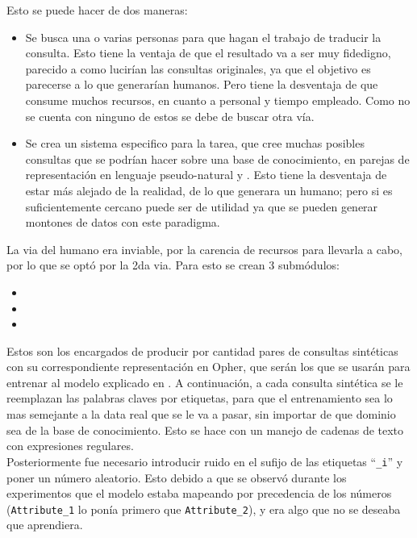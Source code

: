 Esto se puede hacer de dos maneras:
\begin{itemize}
    \item Se busca una o varias personas para que hagan el trabajo de traducir la consulta. Esto tiene la ventaja de que el resultado va a ser muy fidedigno, parecido a como lucir\'ian las consultas originales, ya que el objetivo es parecerse a lo que generar\'ian humanos. Pero tiene la desventaja de que consume muchos recursos, en cuanto a personal y tiempo empleado. Como no se cuenta con ninguno de estos se debe de buscar otra v\'ia.
    
    \item Se crea un sistema especifico para la tarea, que cree muchas posibles consultas que se podr\'ian hacer sobre una base de conocimiento, en parejas de representaci\'on en lenguaje pseudo-natural y . Esto tiene la desventaja de estar m\'as alejado de la realidad, de lo que generara un humano; pero si es suficientemente cercano puede ser de utilidad ya que se pueden generar montones de datos con este paradigma.
\end{itemize}

La via del humano era inviable, por la carencia de recursos para llevarla a cabo, por lo que se opt\'o por la 2da via. Para esto se crean 3 submódulos:

\begin{itemize}
    \item {}
    \item {}
    \item {}
\end{itemize}

Estos son los encargados de producir por cantidad pares de consultas sintéticas con su correspondiente representación en Opher, que ser\'an los que se usar\'an para entrenar al modelo explicado en . A continuaci\'on, a cada consulta sint\'etica se le reemplazan las palabras claves por etiquetas, para que el entrenamiento sea lo mas semejante a la data real que se le va a pasar, sin importar de que dominio sea de la base de conocimiento. Esto se hace con un manejo de cadenas de texto con expresiones regulares.\\

Posteriormente  fue necesario introducir ruido en el sufijo de las etiquetas ``\verb|_i|'' y poner un n\'umero aleatorio. Esto debido a que se observó durante los experimentos que el modelo estaba mapeando por precedencia de los n\'umeros (\verb|Attribute_1| lo pon\'ia primero que \verb|Attribute_2|), y era algo que no se deseaba que aprendiera.\\

